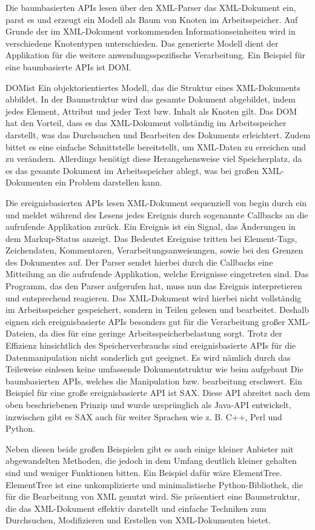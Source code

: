 Die baumbasierten \ac{API}s lesen über den XML-Parser das XML-Dokument ein,
parst es und erzeugt ein Modell als Baum von Knoten im Arbeitsspeicher.
Auf Grunde der im XML-Dokument vorkommenden Informationseinheiten wird in verschiedene Knotentypen unterschieden.
Das generierte Modell dient der Applikation für die weitere anwendungsspezifische Verarbeitung.
Ein Beispiel für eine baumbasierte \ac{API}s ist \ac{DOM}.

\ac{DOM}ist Ein objektorientiertes Modell, das die Struktur eines XML-Dokuments abbildet.
In der Baumstruktur wird das gesamte Dokument abgebildet, indem jedes Element, Attribut und jeder Text bzw. Inhalt als Knoten gilt.
Das DOM hat den Vorteil, dass es das \ac{XML}-Dokument vollständig im Arbeitsspeicher darstellt, was das Durchsuchen und Bearbeiten des Dokuments erleichtert.
Zudem bittet es eine einfache Schnittstelle bereitstellt, um XML-Daten zu erreichen und zu verändern.
Allerdings benötigt diese Herangehensweise viel Speicherplatz,
da es das gesamte Dokument im Arbeitsspeicher ablegt, was bei großen \ac{XML}-Dokumenten ein Problem darstellen kann.\cite*[413,414]{Becher2022}


Die ereignisbasierten \ac{API}s lesen \ac{XML}-Dokument sequenziell von begin durch
ein und meldet während des Lesens jedes Ereignis durch sogenannte Callbacks an die aufrufende Applikation zurück.
Ein Ereignis ist ein Signal, das Änderungen in dem Markup-Status anzeigt.
Das Bedeutet Ereignise tritten bei Element-Tags, Zeichendaten, Kommentaren, Verarbeitungsanweisungen, sowie bei den Grenzen des Dokumentes auf.
Der Parser sendet hierbei durch die Callbacks eine Mitteilung an die aufrufende Applikation, welche Ereignisse eingetreten sind.
Das Programm, das den Parser aufgerufen hat, muss nun das Ereignis interpretieren und entsprechend reagieren.
Das \ac{XML}-Dokument wird hierbei nicht vollständig im Arbeitsspeicher gespeichert, sondern in Teilen gelesen und bearbeitet.
Deshalb eignen sich ereignisbasierte \ac{API}s besonders gut für die Verarbeitung großer \ac{XML}-Dateien, da dies für eine geringe Arbeitsspeicherbelastung sorgt.
Trotz der Effizienz hinsichtlich des Speicherverbrauchs sind ereignisbasierte \ac{API}s für die Datenmanipulation nicht sonderlich gut geeignet.
Es wird nämlich durch das Teileweise einlesen keine umfassende Dokumentstruktur wie beim aufgebaut Die baumbasierten \ac{API}s,
welches die Manipulation bzw. bearbeitung erschwert.
Ein Beispiel für eine große ereignisbasierte \ac{API} ist \ac{SAX}.
Diese \ac{API} abreitet nach dem oben beschriebenen Prinzip und wurde ursprünglich als Java-\ac{API} entwickelt, inzwischen gibt es \ac{SAX} auch für weiter Sprachen wie
z. B. C++, Perl und Python.\cite*[405]{Becher2022}

Neben diesen beide großen Beispielen gibt es auch einige kleiner Anbieter mit abgewandelten Methoden,
die jedoch in dem Umfang deutlich kleiner gehalten sind und weniger Funktionen bitten.
Ein Beispiel dafür wäre ElementTree.
ElementTree ist eine unkomplizierte und minimalistische Python-Bibliothek, die für die Bearbeitung von \ac{XML} genutzt wird.
Sie präsentiert eine Baumstruktur, die das \ac{XML}-Dokument effektiv darstellt und einfache Techniken zum Durchsuchen,
Modifizieren und Erstellen von \ac{XML}-Dokumenten bietet.\cite*{ElementTree2025}


\pagebreak